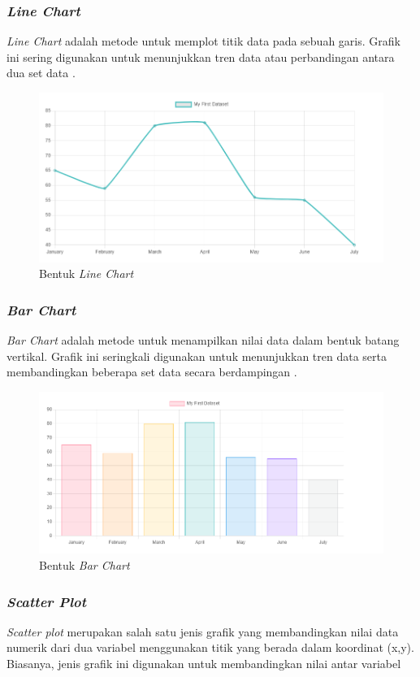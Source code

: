 \subsubsection{\textit{Line Chart}}
\textit{Line Chart} adalah metode untuk memplot titik data pada sebuah garis. Grafik ini sering digunakan untuk menunjukkan tren data atau perbandingan antara dua set data \cite{ChartJs}.

\begin{figure}[H]
	\centering
	\includegraphics[width=0.8\linewidth]{gambar/Dasar teori/LineChart.png}
	\caption{Bentuk \textit{Line Chart}}
	\label{gambar1}
\end{figure}

\subsubsection{\textit{Bar Chart}}
\textit{Bar Chart} adalah metode untuk menampilkan nilai data dalam bentuk batang vertikal. Grafik ini seringkali digunakan untuk menunjukkan tren data serta membandingkan beberapa set data secara berdampingan \cite{ChartJs}.

\begin{figure}[H]
	\centering
	\includegraphics[width=0.8\linewidth]{gambar/Dasar teori/Bar Chart.png}
	\caption{Bentuk \textit{Bar Chart}}
	\label{gambar1}
\end{figure}

\subsubsection{\textit{Scatter Plot}}
\textit{Scatter plot} merupakan salah satu jenis grafik yang membandingkan nilai data numerik dari dua variabel menggunakan titik yang berada dalam koordinat (x,y). Biasanya, jenis grafik ini digunakan untuk membandingkan nilai antar variabel \cite{ChartJs}

